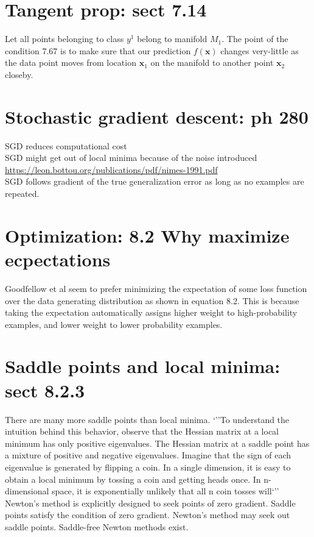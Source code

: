 \documentclass{article}
\begin{document}
\section{Tangent prop: sect 7.14}
Let all points belonging to class $y^1$ belong to manifold $M_1$. The point of the condition 7.67 is to make sure that our prediction $f(\pmb{x})$ changes very-little as the data point moves from location $\pmb{x}_1$ on the manifold to another point $\pmb{x}_2$ closeby. 
%
%
%
\section{Stochastic gradient descent: ph 280}
SGD reduces computational cost\\
SGD might get out of local minima because of the noise introduced \url{https://leon.bottou.org/publications/pdf/nimes-1991.pdf}\\
SGD follows gradient of the true generalization error as long as no examples are repeated.\\
%
%
%
\section{Optimization: 8.2 Why maximize ecpectations}
Goodfellow et al seem to prefer minimizing the expectation of some loss function over the data generating distribution as shown in equation 8.2. This is because taking the expectation automatically assigns higher weight to high-probability examples, and lower weight to lower probability examples.
%
%
%
\section{Saddle points and local minima: sect 8.2.3}
There are many more saddle points than local minima. `''To understand the intuition behind this behavior, observe
that the Hessian matrix at a local minimum has only positive eigenvalues. The
Hessian matrix at a saddle point has a mixture of positive and negative eigenvalues.
Imagine that the sign of each eigenvalue is generated by ﬂipping a coin. In a single
dimension, it is easy to obtain a local minimum by tossing a coin and getting heads
once. In n-dimensional space, it is exponentially unlikely that all n coin tosses will`''\\

Newton's method is explicitly designed to seek points of zero gradient. Saddle points satisfy the condition of zero gradient. Newton's method may seek out saddle points. Saddle-free Newton methods exist.
\end{document}

